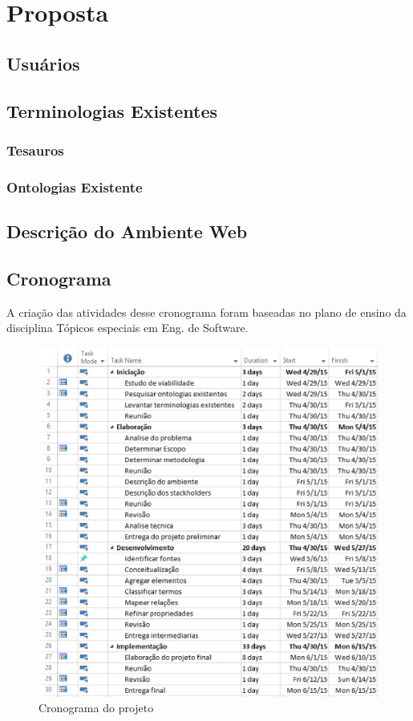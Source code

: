 \chapter{Proposta}\label{cap2}
\section{Usuários}


\section{Terminologias Existentes}

\subsection{Tesauros}

\subsection{Ontologias Existente}


\section{Descrição do Ambiente Web}




\section{Cronograma}
A criação das atividades desse cronograma foram baseadas no plano de ensino da disciplina Tópicos especiais em Eng. de Software. 

 \begin{figure}[ht]
  \centering
    \includegraphics[keepaspectratio=true,scale=0.5]{figuras/cronograma.eps}
  \caption{Cronograma do projeto}
\end{figure}




 





